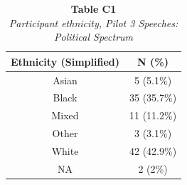\begin{table}
\caption*{
{\large \textbf{Table C1}} \\ 
{\small \emph{Participant ethnicity, Pilot 3 Speeches: Political Spectrum}}
} 
\fontsize{9.0pt}{10.8pt}\selectfont
\begin{tabular*}{\linewidth}{@{\extracolsep{\fill}}cc}
\toprule
Ethnicity (Simplified) & N (\%) \\ 
\midrule\addlinespace[2.5pt]
Asian & 5 (5.1\%) \\ 
Black & 35 (35.7\%) \\ 
Mixed & 11 (11.2\%) \\ 
Other & 3 (3.1\%) \\ 
White & 42 (42.9\%) \\ 
NA & 2 (2\%) \\ 
\bottomrule
\end{tabular*}
\end{table}

